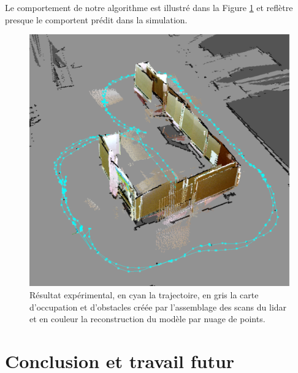 Le comportement de notre algorithme est illustré dans la Figure \ref{fig:exp_angled_view} et reflètre presque le comportent prédit dans la simulation.

\begin{figure}[ht]
  \centering
  \includegraphics[width=0.5\linewidth]{images/exp_angled_view}
  \caption{Résultat expérimental, en cyan la trajectoire, en gris la carte d'occupation et d'obstacles créée par l'assemblage des scans du lidar et en couleur la reconstruction du modèle par nuage de points.}
  \label{fig:exp_angled_view}
\end{figure}

\section{Conclusion et travail futur}
